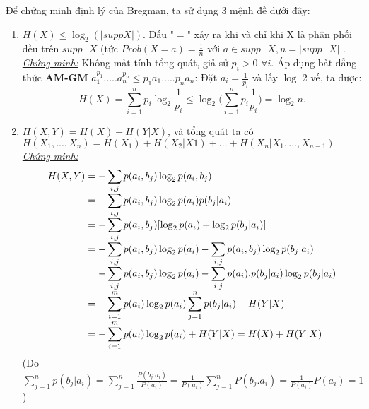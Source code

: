 \documentclass[a4paper]{report}
\begin{document}
Để chứng minh định lý của Bregman, ta sử dụng 3 mệnh đề dưới đây:
\begin{enumerate}[label=\textbf{(\Alph*)}]
\item 
	$H(X) \leq \log_{2}(|supp X|)$. Dấu "$=$" xảy ra khi và chỉ khi X là phân phối đều trên $supp \text{ }X$ (tức $Prob(X=a) = \frac{1}{n}$ với $a \in supp \text{ }X,n=|supp \text{ }X|$ .
\\

\textit{\underline{Chứng minh:}} Không mất tính tổng quát, giả sử $p_{i} > 0$  $\forall i$. Áp dụng bất đẳng thức \textbf{AM-GM} $a_{1}^{p_{1}}. ... .a_{n}^{p_{n}} \leq p_{1}a_{1}. ... .p_{n}a_{n}$: Đặt $a_{i} = \frac{1}{p_{i}}$ và lấy $\log$ 2 vế, ta được:
\begin{equation*}
H(X) = \displaystyle \sum_{i=1}^{n}p_{i}\log_{2}\frac{1}{p_{i}} \leq \log_{2}\Big(\displaystyle \sum_{i=1}^{n}p_{i}\frac{1}{p_{i}}\Big) = \log_{2}n.
\end{equation*}

\item 
	\(H(X,Y) = H(X) + H(Y|X)\), và tổng quát ta có \(H(X_{1},...,X_{n}) = H(X_{1}) + H(X_{2}|X{1}) + ... + H(X_{n}|X_{1},...,X_{n-1})\)
\\

\textit{\underline{Chứng minh:}}
\begin{equation*}
\begin{array}{l@{}l}
H(X,Y)
	&{}= \displaystyle -\sum_{i,j}p(a_{i},b_{j})\log_{2} p(a_{i},b_{j}) \\
	&{}= \displaystyle -\sum_{i,j}p(a_{i},b_{j})\log_{2} p(a_{i})p(b_{j}|a_{i}) \\ 
	&{}= \displaystyle -\sum_{i,j}p(a_{i},b_{j})[\log_{2}p(a_{i}) + \log_{2}p(b_{j}|a_{i}) ] \\
	&{}= \displaystyle -\sum_{i,j}p(a_{i},b_{j})\log_{2}p(a_{i})  \displaystyle -\sum_{i,j}p(a_{i},b_{j})\log_{2}p(b_{j}|a_{i}) \\
	&{}= \displaystyle -\sum_{i,j}p(a_{i},b_{j})\log_{2}p(a_{i}) \displaystyle -\sum_{i,j}p(a_{i}).p(b_{j}|a_{i})\log_{2}p(b_{j}|a_{i}) \\
	&{}= \displaystyle -\sum_{i=1}^{m}p(a_{i}) \log_{2}p(a_{i}) \displaystyle \sum_{j=1}^{n}p(b_{j}|a_{i}) + H(Y|X) \\
	&{}= \displaystyle -\sum_{i=1}^{m}p(a_{i}) \log_{2}p(a_{i}) + H(Y|X) = H(X) + H(Y|X) 
\end{array}
\end{equation*}
(Do $\displaystyle \sum_{j=1}^{n}p(b_{j}|a_{i}) = \displaystyle \sum_{j=1}^{n}\frac{P(b_{j}.a_{i})}{P(a_{i})} = \frac{1}{P(a_{i})}\displaystyle \sum_{j=1}^{n}P(b_{j}.a_{i})=\frac{1}{P(a_{i})}P(a_{i}) =1  $)


\end{enumerate}
\end{document}
